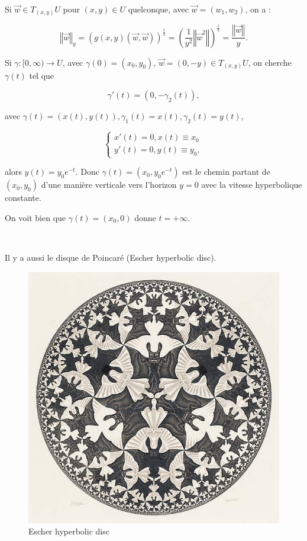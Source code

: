 \documentclass[french]{article}
\theoremstyle{definition}
\theoremstyle{remark}
\begin{document}
\

Si \(\overrightarrow{w} \in T _{(x,y)} U\) pour \((x,y) \in U\) quelconque, avec \(\overrightarrow{w} = (w_1, w_2)\), on a :

\[\left\Vert \overrightarrow{w} \right\Vert _{g} = (g(x,y)(\overrightarrow{w}, \overrightarrow{w})) ^{\frac{1}{2}} = \left(\frac{1}{y ^2} \left\Vert \overrightarrow{w}^2 \right\Vert \right) ^{\frac{1}{2}} = \frac{\left\Vert \overrightarrow{w} \right\Vert }{y}.\]

Si \(\gamma : [0, \infty) \longrightarrow U\), avec \(\gamma(0) = (x_0, y_0)\), \(\overrightarrow{w} =(0, -y) \in T _{(x,y)} U\), on cherche \(\gamma(t)\) tel que

\[\gamma'(t) =(0, -\gamma_2(t)),\]

avec \(\gamma(t) = (x(t), y(t)), \gamma_1(t) = x(t), \gamma_2(t) = y(t)\),

\[\begin{cases}
  x'(t) =0, x(t) \equiv x_0 \\
  y'(t)=0, y(t) \equiv y_0,
\end{cases}\]

alors \(y(t) = y_0 e^{-t} \). Donc \(\gamma(t) = (x_0, y_0 e^{-t})\) est le chemin partant de \((x_0, y_0)\) d'une manière verticale vers l'horizon \(y=0\) avec la vitesse hyperbolique constante.

On voit bien que \(\gamma(t) =(x_0, 0)\) donne \(t = +\infty\).

\

Il y a aussi le disque de Poincaré (Escher hyperbolic disc).

\begin{figure}[h!]
  \centering
  \includegraphics[scale=0.3]{figures/escher.jpg}
  \caption{Escher hyperbolic disc}
  \label{}
\end{figure}
\end{document}
